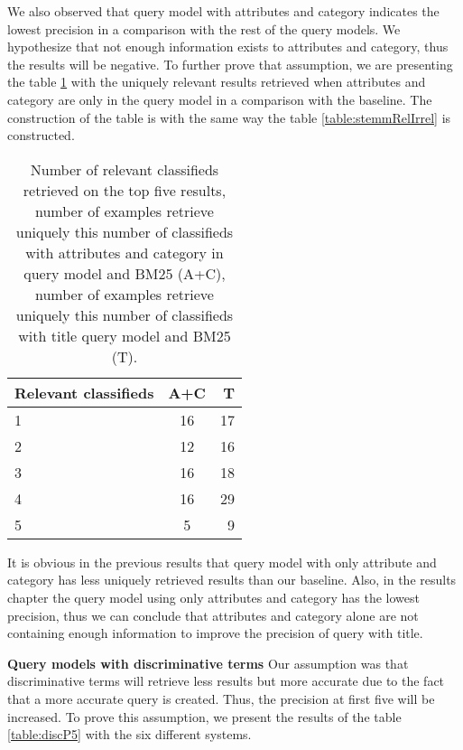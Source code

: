 We also observed that query model with attributes and category indicates the lowest precision in a comparison with the rest of the query models. We hypothesize that not enough information exists to attributes and category, thus the results will be negative. To further prove that assumption, we are presenting the table \ref{table:AcVsT} with the uniquely relevant results retrieved when attributes and category are only in the query model in a comparison with the baseline.  The construction of the table is with the same way the table \ref{table:stemmRelIrrel} is constructed.


\begin{table}[H]
\begin{center}
\caption{Number of relevant classifieds retrieved on the top five results, number of examples retrieve uniquely this number of classifieds with attributes and category in query model and BM25 (A+C), number of examples retrieve uniquely this number of classifieds with title query model and BM25 (T).}
\label{table:AcVsT}
\begin{tabular}{lcr}
\midrule
Relevant classifieds &  A+C & T \\
\midrule
	1 & 16 & 17 \\
	2 & 12  & 16 \\
	3 & 16 & 18 \\
	4 & 16 & 29 \\
	5 & 5 & 9 \\
\bottomrule
\end{tabular}
\end{center}
\end{table}



It is obvious in the previous results that query model with only attribute and category has less uniquely retrieved results than our baseline. Also, in the results chapter the query model using only attributes and category has the lowest precision, thus we can conclude that attributes and category alone are not containing enough information to improve the precision of query with title.


 \textbf{Query models with discriminative terms}
Our assumption was that discriminative terms will retrieve less results but more accurate due to the fact that a more accurate query is created. Thus, the precision at first five will be increased. To prove this assumption, we present the results of the table \ref{table:discP5} with the six different systems.


